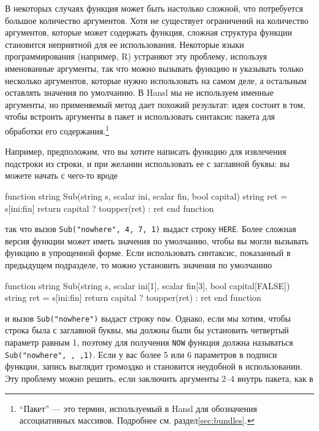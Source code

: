 В некоторых случаях функция может быть настолько сложной, что
потребуется большое количество аргументов. Хотя не существует
ограничений на количество аргументов, которые может содержать функция,
сложная структура функции становится неприятной для ее
использования. Некоторые языки программирования (например, R)
устраняют эту проблему, используя именованные аргументы, так что можно
вызывать функцию и указывать только несколько аргументов, которые
нужно использовать на самом деле, а остальным оставлять значения по
умолчанию.  В Hansl мы не используем именные аргументы, но применяемый
метод дает похожий результат: идея состоит в том, чтобы встроить
аргументы в пакет и использовать синтаксис пакета для обработки его
содержания.\footnote{``Пакет'' --- это термин, используемый в Hansl
  для обозначения ассоциативных массивов. Подробнее
  см. раздел\ref{sec:bundles}.}

Например, предположим, что вы хотите написать функцию для извлечения
подстроки из строки, и при желании использовать ее с заглавной буквы:
вы можете начать с чего-то вроде
\begin{code}
function string Sub(string s, scalar ini, scalar fin, bool capital)
    string ret = s[ini:fin]
    return capital ? toupper(ret) : ret
end function
\end{code}
так что вызов \texttt{Sub("nowhere", 4, 7, 1)} выдаст строку
\texttt{HERE}. Более сложная версия функции может иметь значения по
умолчанию, чтобы вы могли вызывать функцию в упрощенной форме. Если
использовать синтаксис, показанный в предыдущем подразделе, то можно
установить значения по умолчанию
\begin{code}
function string Sub(string s, scalar ini[1], scalar fin[3], bool capital[FALSE])
    string ret = s[ini:fin]
    return capital ? toupper(ret) : ret
end function
\end{code}
и вызов \texttt{Sub("nowhere")} выдаст строку \texttt{now}. Однако,
если мы хотим, чтобы строка была с заглавной буквы, мы должны были бы
установить четвертый параметр равным 1, поэтому для получения
\texttt{NOW} функция должна называться \texttt{Sub("nowhere", ,
  ,1)}. Если у вас более 5 или 6 параметров в подписи функции, запись
выглядит громоздко и становится неудобной в использовании.  Эту
проблему можно решить, если заключить аргументы 2–4 внутрь пакета, как
в

